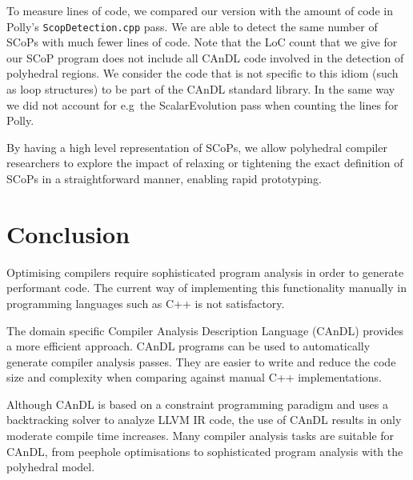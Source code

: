     To measure lines of code, we compared our version with the amount of code in
    Polly's \texttt{ScopDetection.cpp} pass.
    We are able to detect the same number of SCoPs with much fewer lines of
    code.
    Note that the LoC count that we give for our SCoP program does not include
    all CAnDL code involved in the detection of polyhedral regions.
    We consider the code that is not specific to this idiom (such as loop
    structures) to be part of the CAnDL standard library.
    In the same way we did not account for e.g\ the ScalarEvolution pass when
    counting the lines for Polly.

    By having a high level representation of SCoPs, we allow polyhedral compiler
    researchers to explore the impact of relaxing or tightening the exact
    definition of SCoPs in a straightforward manner, enabling rapid prototyping.

\begin{figure}[ht]
    
    \label{fig:candlvspolly}
\end{figure}

\section{Conclusion}

    Optimising compilers require sophisticated program analysis in order to
    generate performant code.
    The current way of implementing this functionality manually in programming
    languages such as C++ is not satisfactory.

    The domain specific Compiler Analysis Description Language (CAnDL) provides
    a more efficient approach.
    CAnDL programs can be used to automatically generate compiler analysis
    passes.
    They are easier to write and reduce the code size and complexity when
    comparing against manual C++ implementations.

    Although CAnDL is based on a constraint programming paradigm and uses a
    backtracking solver to analyze LLVM IR code, the use of CAnDL results in
    only moderate compile time increases.
    Many compiler analysis tasks are suitable for CAnDL, from
    peephole optimisations to sophisticated program analysis with the polyhedral
    model.
